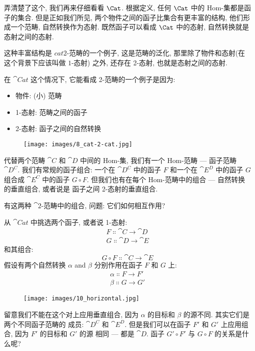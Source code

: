 弄清楚了这个, 我们再来仔细看看 $\Cat$. 根据定义, 任何 $\Cat$ 中的 Hom-集都是函子的集合. 但是正如我们所见,
两个物件之间的函子比集合有更丰富的结构, 他们形成一个范畴, 自然转换作为态射. 既然函子可以看成 $\Cat$ 中的态射,
自然转换就是态射之间的态射.

这种丰富结构是 $cat{2}$-范畴的一个例子, 这是范畴的泛化, 那里除了物件和态射(在这个背景下应该叫做 $1$-态射)
之外, 还存在 2-态射, 也就是态射之间的态射.

在 $\cat{Cat}$ 这个情况下, 它能看成 2-范畴的一个例子是因为:

\begin{itemize}
  \tightlist
  \item
        物件: (小) 范畴
  \item
        1-态射: 范畴之间的函子
  \item
        2-态射: 函子之间的自然转换
\end{itemize}

\begin{figure}[H]
  \centering
  \texttt{[image: images/8\_cat-2-cat.jpg]}
\end{figure}

\noindent
代替两个范畴 $\cat{C}$ 和 $\cat{D}$ 中间的 Hom-集, 我们有一个 Hom-范畴 --- 函子范畴 $\cat{D^C}$.
我们有常规的函子组合: 一个在 $\cat{D^C}$ 中的函子 $F$ 和一个在 $\cat{E^D}$ 中的函子 $G$ 组合成
$\cat{E^C}$ 中的函子 $G \circ F$. 但我们也有在每个 Hom-范畴中的组合 --- 自然转换的垂直组合, 或者说是
函子之间 2-态射的垂直组合.

有这两种 $\cat{2}$-范畴中的组合, 问题: 它们如何相互作用?

从 $\cat{Cat}$ 中挑选两个函子, 或者说 1-态射:
\begin{gather*}
  F \Colon \cat{C} \to \cat{D} \\
  G \Colon \cat{D} \to \cat{E}
\end{gather*}
和其组合:
\[G \circ F \Colon \cat{C} \to \cat{E}\]
假设有两个自然转换 $\alpha$ and $\beta$ 分别作用在函子 $F$ 和 $G$ 上:
\begin{gather*}
  \alpha \Colon F \to F' \\
  \beta \Colon G \to G'
\end{gather*}

\begin{figure}[H]
  \centering
  \texttt{[image: images/10\_horizontal.jpg]}
\end{figure}

\noindent
留意我们不能在这个对上应用垂直组合, 因为 $\alpha$ 的目标和 $\beta$ 的源不同. 其实它们是两个不同函子范畴的
成员: $\cat{D^C}$ 和 $\cat{E^D}$. 但是我们可以在函子 $F'$ 和 $G'$ 上应用组合, 因为 $F'$ 的目标和 $G'$ 的源
相同 --- 都是 $\cat{D}$. 函子 $G' \circ F'$ 与 $G \circ F$ 的关系是什么呢?

